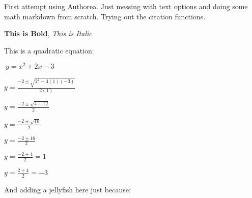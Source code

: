 First attempt using Authorea. Just messing with text options and doing some math markdown from scratch. Trying out the citation functions.

\textbf{This is Bold}, \textit{This is Italic}

This is a quadratic equation:

$\ y = x^{2} + 2x -3 $


$ y = \frac{-2 \pm \sqrt{2^{2}-4(1)(-3)}}{2(1)}$

$ y = \frac{-2 \pm \sqrt{4+12}}{2}$

$ y = \frac{-2 \pm \sqrt{16}}{2}$

$ y = \frac{-2 \pm {16}}{2}$

$ y = \frac{-2 + {4}}{2} = 1$

$ y = \frac{2 + {4}}{2} = -3$


And adding a jellyfish here just because:

    